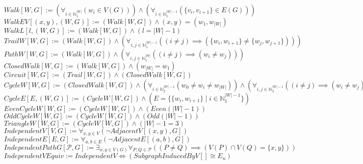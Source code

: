 \documentclass{book}
\newcommand{\abr}{:=}
\newcommand{\pr}[1]{\left(#1\right)}
\newcommand{\st}{\mathbin{|}}
\newcommand{\utup}[1]{\{#1\}}
\begin{document}


\newpage



$Walk[W, G] \abr \pr{\forall_{i \in \mathbb{N}_1^{|W|}}\pr{w_i \in V(G)}} \land \pr{\forall_{i \in \mathbb{N}_1^{|W| - 1}}\pr{\utup{v_i, v_{i + 1}} \in E(G)}}$ \\
$WalkEV[(x, y), (W, G)] \abr (Walk[W, G]) \land (x, y) = (w_1, w_{|W|})$ \\
$WalkL[l, (W, G)] \abr (Walk[W, G]) \land (l = |W| - 1)$ \\
$TrailW[W, G] \abr (Walk[W, G]) \land \pr{\forall_{i, j \in \mathbb{N}_1^{|W| - 1}}\pr{(i \neq j) \implies (\utup{w_i, w_{i + 1}} \neq \utup{w_j, w_{j + 1}})}}$ \\
$PathW[W, G] \abr (Walk[W, G]) \land \pr{\forall_{i, j \in \mathbb{N}_1^{|W|}}\pr{(i \neq j) \implies (w_i \neq w_j)}}$ \\

$ClosedWalk[W, G] \abr (Walk[W, G]) \land (w_{|W|} = w_1)$ \\
$Circuit[W, G] \abr (Trail[W, G]) \land (ClosedWalk[W, G])$ \\
$CycleW[W, G] \abr (ClosedWalk[W, G]) \land \pr{\forall_{i \in \mathbb{N}_2^{|W| - 1}}(w_0 \neq w_i \neq w_{|W|})} \land \pr{\forall_{i, j \in \mathbb{N}_2^{|W| - 1}}\pr{(i \neq j) \implies (w_i \neq w_j)}} \land (|W| - 1 \geq 3)$ \\
$CycleE[E, (W, G)] \abr (CycleW[W, G]) \land (E = \{\utup{w_i, w_{i + 1}} \st i \in \mathbb{N}_1^{|W| - 1}\})$ \\
$EvenCycleW[W, G] \abr (CycleW[W, G]) \land \pr{Even(|W| - 1)}$ \\
$OddCycleW[W, G] \abr (CycleW[W, G]) \land \pr{Odd(|W| - 1)}$ \\
$TriangleW[W, G] \abr (CycleW[W, G]) \land (|W| - 1 = 3)$ \\

$IndependentV[V, G] \abr \forall_{x, y \in V}\pr{\lnot AdjacentV[(x, y), G]}$ \\
$IndependentE[E, G] \abr \forall_{a, b \in E}\pr{\lnot AdjacentE[(a, b), G]}$ \\
$IndependentPathG[\mathcal{P}, G] \abr \exists_{x, y \in V(G)} \forall_{P, Q \in \mathcal{P}}\pr{(P \neq Q) \implies \pr{V(P) \cap V(Q) = \utup{x, y}}}$ \\
$IndependentVEquiv \abr IndependentV \iff (SubgraphInducedByV[] \cong E_n)$ \\
\end{document}
